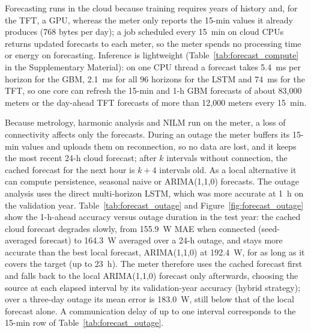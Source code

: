 \documentclass[fleqn,10pt]{wlscirep}
\begin{document}
Forecasting runs in the cloud because training requires years of history and, for the TFT, a GPU, whereas the meter only reports the 15-min values it already produces (768 bytes per day); a job scheduled every 15~min on cloud CPUs returns updated forecasts to each meter, so the meter spends no processing time or energy on forecasting. Inference is lightweight (Table~\ref{tab:forecast_compute} in the Supplementary Material): on one CPU thread a forecast takes 5.4~ms per horizon for the GBM, 2.1~ms for all 96 horizons for the LSTM and 74~ms for the TFT, so one core can refresh the 15-min and 1-h GBM forecasts of about 83{,}000 meters or the day-ahead TFT forecasts of more than 12{,}000 meters every 15~min.

Because metrology, harmonic analysis and NILM run on the meter, a loss of connectivity affects only the forecasts. During an outage the meter buffers its 15-min values and uploads them on reconnection, so no data are lost, and it keeps the most recent 24-h cloud forecast; after $k$ intervals without connection, the cached forecast for the next hour is $k + 4$ intervals old. As a local alternative it can compute persistence, seasonal naive or ARIMA(1,1,0) forecasts. The outage analysis uses the direct multi-horizon LSTM, which was more accurate at 1~h on the validation year. Table~\ref{tab:forecast_outage} and Figure~\ref{fig:forecast_outage} show the 1-h-ahead accuracy versus outage duration in the test year: the cached cloud forecast degrades slowly, from 155.9~W MAE when connected (seed-averaged forecast) to 164.3~W averaged over a 24-h outage, and stays more accurate than the best local forecast, ARIMA(1,1,0) at 192.4~W, for as long as it covers the target (up to 23~h). The meter therefore uses the cached forecast first and falls back to the local ARIMA(1,1,0) forecast only afterwards, choosing the source at each elapsed interval by its validation-year accuracy (hybrid strategy); over a three-day outage its mean error is 183.0~W, still below that of the local forecast alone. A communication delay of up to one interval corresponds to the 15-min row of Table~\ref{tab:forecast_outage}.
\end{document}
